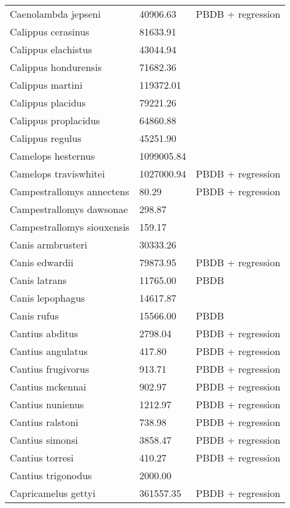 \begin{center}
\begin{longtable}{p{} p{} p{} }
  Caenolambda jepseni & 40906.63 & PBDB + regression \\ 
  Calippus cerasinus & 81633.91 & \cite{Tomiya2013} \\ 
  Calippus elachistus & 43044.94 & \cite{Tomiya2013} \\ 
  Calippus hondurensis & 71682.36 & \cite{Tomiya2013} \\ 
  Calippus martini & 119372.01 & \cite{Tomiya2013} \\ 
  Calippus placidus & 79221.26 & \cite{Tomiya2013} \\ 
  Calippus proplacidus & 64860.88 & \cite{Tomiya2013} \\ 
  Calippus regulus & 45251.90 & \cite{Tomiya2013} \\ 
  Camelops hesternus & 1099005.84 & \cite{Smith2004} \\ 
  Camelops traviswhitei & 1027000.94 & PBDB + regression \\ 
  Campestrallomys annectens & 80.29 & PBDB + regression \\ 
  Campestrallomys dawsonae & 298.87 & \cite{Tomiya2013} \\ 
  Campestrallomys siouxensis & 159.17 & \cite{Tomiya2013} \\ 
  Canis armbrusteri & 30333.26 & \cite{Tomiya2013} \\ 
  Canis edwardii & 79873.95 & PBDB + regression \\ 
  Canis latrans & 11765.00 & PBDB \\ 
  Canis lepophagus & 14617.87 & \cite{Tomiya2013} \\ 
  Canis rufus & 15566.00 & PBDB \\ 
  Cantius abditus & 2798.04 & PBDB + regression \\ 
  Cantius angulatus & 417.80 & PBDB + regression \\ 
  Cantius frugivorus & 913.71 & PBDB + regression \\ 
  Cantius mckennai & 902.97 & PBDB + regression \\ 
  Cantius nunienus & 1212.97 & PBDB + regression \\ 
  Cantius ralstoni & 738.98 & PBDB + regression \\ 
  Cantius simonsi & 3858.47 & PBDB + regression \\ 
  Cantius torresi & 410.27 & PBDB + regression \\ 
  Cantius trigonodus & 2000.00 & \cite{Soligo2006} \\ 
  Capricamelus gettyi & 361557.35 & PBDB + regression \\ 

\end{longtable}
\end{center}
